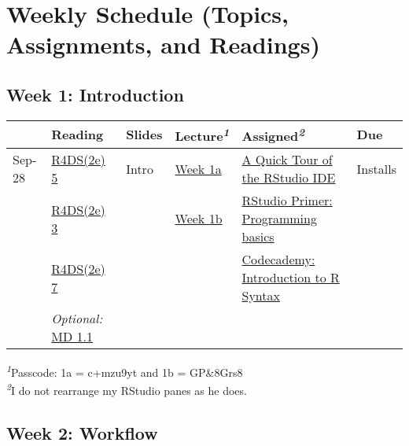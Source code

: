 \documentclass[
  letterpaper,
  DIV=11,
  numbers=noendperiod]{scrartcl}
\begin{document}
\hypertarget{weekly-schedule-topics-assignments-and-readings}{%
\section{Weekly Schedule (Topics, Assignments, and
Readings)}\label{weekly-schedule-topics-assignments-and-readings}}

\hypertarget{week-1-introduction}{%
\subsection{Week 1: Introduction}\label{week-1-introduction}}

\setlength{\LTpost}{0mm}
\begin{longtable*}{llllll}
\toprule
 & Reading & Slides & Lecture\textsuperscript{\textit{1}} & Assigned\textsuperscript{\textit{2}} & Due \\ 
\midrule\addlinespace[2.5pt]
Sep-28 & \href{https://r4ds.hadley.nz/workflow-style}{R4DS(2e) 5} & {Intro} & \href{https://uoregon.zoom.us/rec/share/DLSlztxTWOsJ55bPGyfzn1loxztsG-Ya04Nw_2yVUSpa9jK0S51uPWYXYjpWkFk3.zLqlIbfHpbPgK8Iy}{Week 1a} & \href{https://milton-the-cat.rocks/learnr/r/r_getting_started/\#section-a-quick-tour-of-r-studio}{A Quick Tour of the RStudio IDE} & {Installs} \\ 
 & \href{https://r4ds.hadley.nz/workflow-basics}{R4DS(2e) 3} &  & \href{https://uoregon.zoom.us/rec/share/GbKCCbtyyXYRbJybVY4j7Fo9Wj4KOOSQUEaEBl0kXSCf3Jpfje_StThgyoLO17J9.ktL5w_SJHfKEVJs9}{Week 1b} & \href{https://posit.cloud/learn/primers/1.2}{RStudio Primer: Programming basics} &  \\ 
 & \href{https://r4ds.hadley.nz/workflow-scripts}{R4DS(2e) 7} &  &  & \href{https://www.codecademy.com/courses/learn-r/lessons/introduction-to-r/exercises/why-r}{Codecademy: Introduction to R Syntax} &  \\ 
 & \emph{Optional:} \href{https://moderndive.com/1-getting-started.html\#r-rstudio}{MD 1.1} &  &  &  &  \\ 
\bottomrule
\end{longtable*}
\begin{minipage}{\linewidth}
\textsuperscript{\textit{1}}Passcode: 1a = c+mzu9yt and 1b = GP\&8Grs8\\
\textsuperscript{\textit{2}}I do not rearrange my RStudio panes as he does.\\
\end{minipage}

\hypertarget{week-2-workflow}{%
\subsection{Week 2: Workflow}\label{week-2-workflow}}
\end{document}
